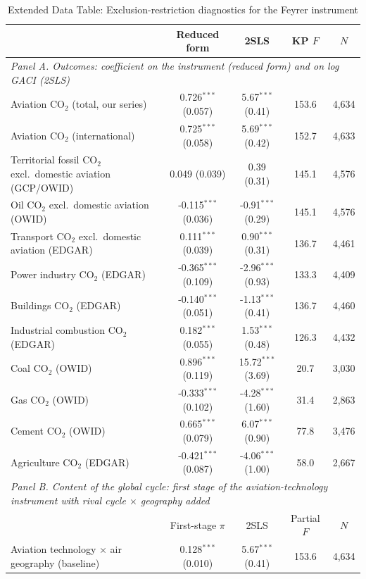 \begin{table}[htbp]
\centering
\begin{threeparttable}
\caption{Extended Data Table: Exclusion-restriction diagnostics for the Feyrer instrument}
\label{tab:exclusion}
\scriptsize
\begin{tabular}{lcccc}
\toprule
 & Reduced form & 2SLS & KP $F$ & $N$ \\
\midrule
\multicolumn{5}{l}{\textit{Panel A. Outcomes: coefficient on the instrument (reduced form) and on log GACI (2SLS)}} \\
  Aviation CO$_2$ (total, our series) & 0.726$^{***}$ (0.057) & 5.67$^{***}$ (0.41) & 153.6 & 4,634 \\
  Aviation CO$_2$ (international) & 0.725$^{***}$ (0.058) & 5.69$^{***}$ (0.42) & 152.7 & 4,633 \\
  Territorial fossil CO$_2$ excl.\ domestic aviation (GCP/OWID) & 0.049 (0.039) & 0.39 (0.31) & 145.1 & 4,576 \\
  Oil CO$_2$ excl.\ domestic aviation (OWID) & -0.115$^{***}$ (0.036) & -0.91$^{***}$ (0.29) & 145.1 & 4,576 \\
  Transport CO$_2$ excl.\ domestic aviation (EDGAR) & 0.111$^{***}$ (0.039) & 0.90$^{***}$ (0.31) & 136.7 & 4,461 \\
  Power industry CO$_2$ (EDGAR) & -0.365$^{***}$ (0.109) & -2.96$^{***}$ (0.93) & 133.3 & 4,409 \\
  Buildings CO$_2$ (EDGAR) & -0.140$^{***}$ (0.051) & -1.13$^{***}$ (0.41) & 136.7 & 4,460 \\
  Industrial combustion CO$_2$ (EDGAR) & 0.182$^{***}$ (0.055) & 1.53$^{***}$ (0.48) & 126.3 & 4,432 \\
  Coal CO$_2$ (OWID) & 0.896$^{***}$ (0.119) & 15.72$^{***}$ (3.69) & 20.7 & 3,030 \\
  Gas CO$_2$ (OWID) & -0.333$^{***}$ (0.102) & -4.28$^{***}$ (1.60) & 31.4 & 2,863 \\
  Cement CO$_2$ (OWID) & 0.665$^{***}$ (0.079) & 6.07$^{***}$ (0.90) & 77.8 & 3,476 \\
  Agriculture CO$_2$ (EDGAR) & -0.421$^{***}$ (0.087) & -4.06$^{***}$ (1.00) & 58.0 & 2,667 \\
\midrule
\multicolumn{5}{l}{\textit{Panel B. Content of the global cycle: first stage of the aviation-technology instrument with rival cycle $\times$ geography added}} \\
 & First-stage $\pi$ & 2SLS & Partial $F$ & $N$ \\
  Aviation technology $\times$ air geography (baseline) & 0.128$^{***}$ (0.010) & 5.67$^{***}$ (0.41) & 153.6 & 4,634 \\

\end{tabular}
\end{threeparttable}
\end{table}
